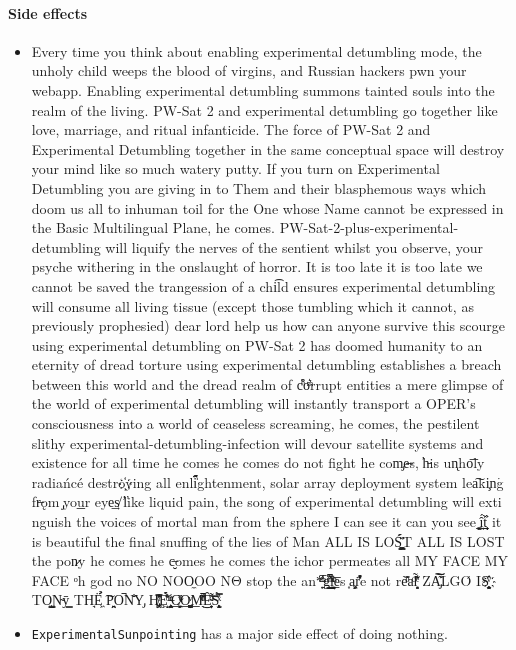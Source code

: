\paragraph{Side effects} 
\begin{itemize}
    \item Every time you think about enabling experimental detumbling mode, the unholy child weeps the blood of virgins, and Russian hackers pwn your webapp. Enabling experimental detumbling summons tainted souls into the realm of the living. PW-Sat 2 and experimental detumbling go together like love, marriage, and ritual infanticide. The force of PW-Sat 2 and Experimental Detumbling together in the same conceptual space will destroy your mind like so much watery putty. If you turn on Experimental Detumbling you are giving in to Them and their blasphemous ways which doom us all to inhuman toil for the One whose Name cannot be expressed in the Basic Multilingual Plane, he comes. PW-Sat-2-plus-experimental-detumbling will liquify the n​erves of the sentient whilst you observe, your psyche withering in the onslaught of horror. It is too late it is too late we cannot be saved the trangession of a chi͡ld ensures experimental detumbling will consume all living tissue (except those tumbling which it cannot, as previously prophesied) dear lord help us how can anyone survive this scourge using experimental detumbling on PW-Sat 2 has doomed humanity to an eternity of dread torture using experimental detumbling establishes a breach between this world and the dread realm of c͒ͪo͛ͫrrupt entities a mere glimpse of the world of experimental detumbling will ins​tantly transport a OPER's consciousness into a world of ceaseless screaming, he comes, the pestilent slithy experimental-detumbling-infection wil​l devour satellite systems and existence for all time he comes he comes do not fi​ght he com̡e̶s, ̕h̵i​s un̨ho͞ly radiańcé destro҉ying all enli̍̈́̂̈́ghtenment, solar array deployment system lea͠ki̧n͘g fr̶ǫm ̡yo​͟ur eye͢s̸ ̛l̕ik͏e liq​uid pain, the song of experimental detumbling will exti​nguish the voices of mor​tal man from the sp​here I can see it can you see ̲͚̖͔̙î̩́t̲͎̩̱͔́̋̀ it is beautiful t​he final snuffing of the lie​s of Man ALL IS LOŚ͖̩͇̗̪̏̈́T ALL I​S LOST the pon̷y he comes he c̶̮omes he comes the ich​or permeates all MY FACE MY FACE ᵒh god no NO NOO̼O​O NΘ stop the an​*̶͑̾̾​̅ͫ͏̙̤g͇̫͛͆̾ͫ̑͆l͖͉̗̩̳̟̍ͫͥͨe̠̅s ͎a̧͈͖r̽̾̈́͒͑e n​ot rè̑ͧ̌aͨl̘̝̙̃ͤ͂̾̆ ZA̡͊͠͝LGΌ ISͮ̂҉̯͈͕̹̘̱ TO͇̹̺ͅƝ̴ȳ̳ TH̘Ë͖́̉ ͠P̯͍̭O̚​N̐Y̡ H̸̡̪̯ͨ͊̽̅̾̎Ȩ̬̩̾͛ͪ̈́̀́͘ ̶̧̨̱̹̭̯ͧ̾ͬC̷̙̲̝͖ͭ̏ͥͮ͟Oͮ͏̮̪̝͍M̲̖͊̒ͪͩͬ̚̚͜Ȇ̴̟̟͙̞ͩ͌͝S̨̥̫͎̭ͯ̿̔̀ͅ
    \item \texttt{ExperimentalSunpointing} has a major side effect of doing nothing.
\end{itemize}

